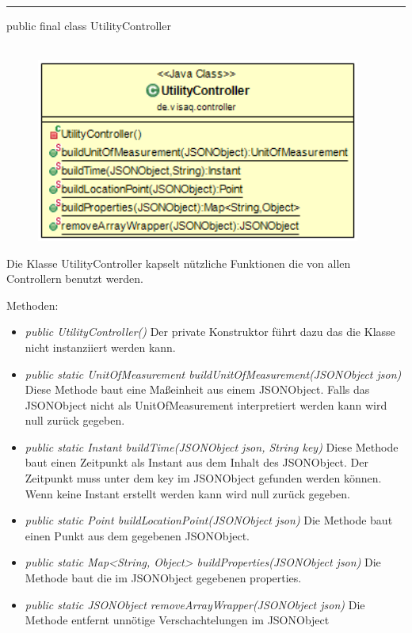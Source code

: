 \rule{\textwidth}{0.4pt}
public final class UtilityController
\\\\
\begin{minipage}{0.4\textwidth}
    \begin{figure}[H]
        {\centering\includegraphics[width=0.95\textwidth]{media/backend/controller/classes/UtilityController.png}}
    \end{figure}
    \end{minipage} \hfill
\begin{minipage}{0.6\textwidth}
    Die Klasse UtilityController kapselt nützliche Funktionen die von allen Controllern benutzt werden.
\end{minipage}

Methoden:
\begin{itemize}
    \item \emph{public UtilityController()}
    Der private Konstruktor führt dazu das die Klasse nicht instanziiert werden kann.
    \item \emph{public static UnitOfMeasurement buildUnitOfMeasurement(JSONObject json)}
    Diese Methode baut eine Maßeinheit aus einem JSONObject. Falls das JSONObject nicht als UnitOfMeasurement interpretiert werden kann wird null zurück gegeben.
    \item \emph{public static Instant buildTime(JSONObject json, String key)}
    Diese Methode baut einen Zeitpunkt als Instant aus dem Inhalt des JSONObject. Der Zeitpunkt muss unter dem key im JSONObject gefunden werden können.
    Wenn keine Instant erstellt werden kann wird null zurück gegeben.
    \item \emph{public static Point buildLocationPoint(JSONObject json)}
    Die Methode baut einen Punkt aus dem gegebenen JSONObject.
    \item \emph{public static Map<String, Object> buildProperties(JSONObject json)}
    Die Methode baut die im JSONObject gegebenen properties.
    \item \emph{public static JSONObject removeArrayWrapper(JSONObject json)}
    Die Methode entfernt unnötige Verschachtelungen im JSONObject 
\end{itemize}